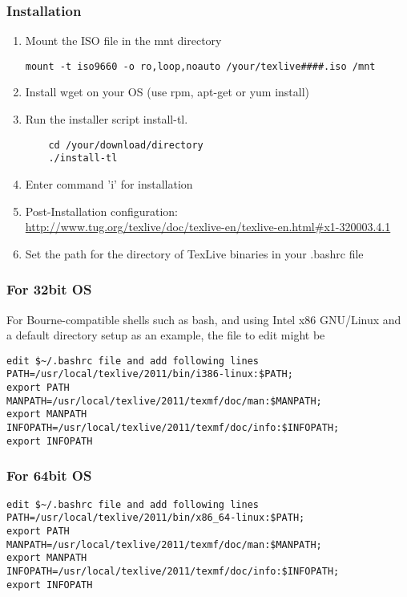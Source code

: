 \subsubsection*{Installation}
\begin{enumerate}
\item	Mount the ISO file in the mnt directory
\begin{verbatim}
mount -t iso9660 -o ro,loop,noauto /your/texlive####.iso /mnt
\end{verbatim}

\item	Install wget on your OS (use rpm, apt-get or yum install)
\item	Run the installer script install-tl.
\begin{verbatim}
	cd /your/download/directory
	./install-tl
\end{verbatim}
\item	Enter command 'i' for installation

\item	Post-Installation configuration:\\
\href{http://www.tug.org/texlive/doc/texlive-en/texlive-en.html\#x1-320003.4.1}
{http://www.tug.org/texlive/doc/texlive-en/texlive-en.html\#x1-320003.4.1} 
\item	Set the path for the directory of TexLive binaries in your .bashrc file
\end{enumerate}

\subsubsection*{For 32bit OS}
For Bourne-compatible shells such as bash, and using Intel x86 GNU/Linux and a default directory setup as an example, the file to edit might be \begin{verbatim}
edit $~/.bashrc file and add following lines
PATH=/usr/local/texlive/2011/bin/i386-linux:$PATH; 
export PATH 
MANPATH=/usr/local/texlive/2011/texmf/doc/man:$MANPATH;
export MANPATH 
INFOPATH=/usr/local/texlive/2011/texmf/doc/info:$INFOPATH;
export INFOPATH
\end{verbatim}
\subsubsection*{For 64bit OS}
\begin{verbatim}
edit $~/.bashrc file and add following lines
PATH=/usr/local/texlive/2011/bin/x86_64-linux:$PATH;
export PATH 
MANPATH=/usr/local/texlive/2011/texmf/doc/man:$MANPATH;
export MANPATH 
INFOPATH=/usr/local/texlive/2011/texmf/doc/info:$INFOPATH;
export INFOPATH

\end{verbatim}



